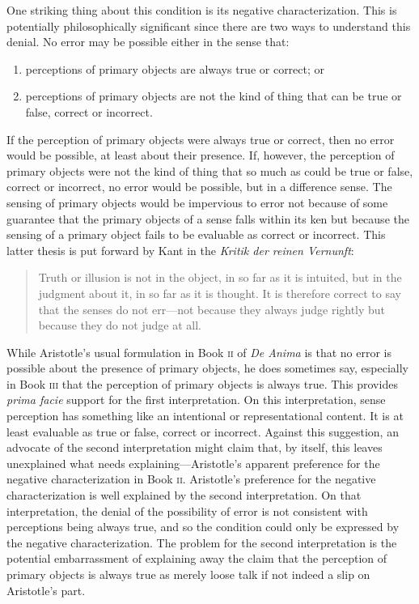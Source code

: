 One striking thing about this condition is its negative characterization. This is potentially philosophically significant since there are two ways to understand this denial. No error may be possible either in the sense that:
\begin{enumerate}[(1)]
	\item perceptions of primary objects are always true or correct; or
	\item perceptions of primary objects are not the kind of thing that can be true or false, correct or incorrect.
\end{enumerate}
If the perception of primary objects were always true or correct, then no error would be possible, at least about their presence. If, however, the perception of primary objects were not the kind of thing that so much as could be true or false, correct or incorrect, no error would be possible, but in a difference sense. The sensing of primary objects would be impervious to error not because of some guarantee that the primary objects of a sense falls within its ken but because the sensing of a primary object fails to be evaluable as correct or incorrect. This latter thesis is put forward by Kant in the \emph{Kritik der reinen Vernunft}:
\begin{quote}
	Truth or illusion is not in the object, in so far as it is intuited, but in the judgment about it, in so far as it is thought. It is therefore correct to say that the senses do not err---not because they always judge rightly but because they do not judge at all. \citep[\textsc{a}294/\textsc{b}350]{Kant:1781fk}
\end{quote}

While Aristotle's usual formulation in Book \textsc{ii} of \emph{De Anima} is that no error is possible about the presence of primary objects, he does sometimes say, especially in Book \textsc{iii} that the perception of primary objects is always true. This provides \emph{prima facie} support for the first interpretation. On this interpretation, sense perception has something like an intentional or representational content. It is at least evaluable as true or false, correct or incorrect. Against this suggestion, an advocate of the second interpretation might claim that, by itself, this leaves unexplained what needs explaining---\-Aristotle's apparent preference for the negative characterization in Book \textsc{ii}. Aristotle's preference for the negative characterization is well explained by the second interpretation. On that interpretation, the denial of the possibility of error is not consistent with perceptions being always true, and so the condition could only be expressed by the negative characterization. The problem for the second interpretation is the potential embarrassment of explaining away the claim that the perception of primary objects is always true as merely loose talk if not indeed a slip on Aristotle's part.

